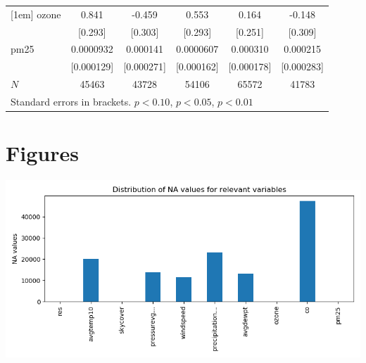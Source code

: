 \documentclass[11pt]{article}
\begin{document}
\begin{subappendices}
\begin{center}
{{\begin{tabular}{l*{5}{c}}
						[1em]
						ozone       &       0.841\sym{***}&      -0.459         &       0.553\sym{*}  &       0.164         &      -0.148         \\
						&     [0.293]         &     [0.303]         &     [0.293]         &     [0.251]         &     [0.309]         \\
						[1em]
						pm25        &   0.0000932         &    0.000141         &   0.0000607         &    0.000310\sym{*}  &    0.000215         \\
						&  [0.000129]         &  [0.000271]         &  [0.000162]         &  [0.000178]         &  [0.000283]         \\
						\hline
						\(N\)       &       45463         &       43728         &       54106         &       65572         &       41783         \\
						\hline\hline
				\multicolumn{5}{l}{\footnotesize Standard errors in brackets. \sym{*} \(p<0.10\), \sym{**} \(p<0.05\), \sym{***} \(p<0.01\)}\\
					\end{tabular}
				}
				
			}
		\end{center}
		
		\newpage
		\begin{center}
			 \label{tab:title} 
			{
			
			}
		\end{center}
		
	
	\newpage 
	\section{Figures}\label{BSec:xxxxx}	
		\begin{center}
		 \label{tab:title} 
		{
		\includegraphics[scale=0.85]{plot_na_dist_of_n_cols_with_most_na.png}		
		}
		\end{center}
	

\end{subappendices}
\end{document}
